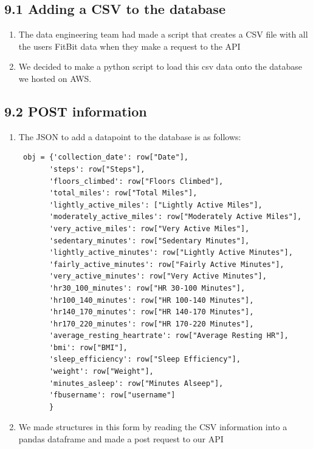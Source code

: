 \documentclass[]{book}
\providecommand{\tightlist}{%
  \setlength{\itemsep}{0pt}\setlength{\parskip}{0pt}}
\begin{document}
\subsection{9.1 Adding a CSV to the
database}\label{adding-a-csv-to-the-database-1}

\begin{enumerate}
\def\labelenumi{\arabic{enumi}.}
\tightlist
\item
  The data engineering team had made a script that creates a CSV file
  with all the users FitBit data when they make a request to the API
\item
  We decided to make a python script to load this csv data onto the
  database we hosted on AWS.
\end{enumerate}

\subsection{9.2 POST information}\label{post-information-1}

\begin{enumerate}
\def\labelenumi{\arabic{enumi}.}
\item
  The JSON to add a datapoint to the database is as follows:

\begin{verbatim}
 obj = {'collection_date': row["Date"],
       'steps': row["Steps"],
       'floors_climbed': row["Floors Climbed"],
       'total_miles': row["Total Miles"],
       'lightly_active_miles': ["Lightly Active Miles"],
       'moderately_active_miles': row["Moderately Active Miles"],
       'very_active_miles': row["Very Active Miles"],
       'sedentary_minutes': row["Sedentary Minutes"],
       'lightly_active_minutes': row["Lightly Active Minutes"],
       'fairly_active_minutes': row["Fairly Active Minutes"],
       'very_active_minutes': row["Very Active Minutes"],
       'hr30_100_minutes': row["HR 30-100 Minutes"],
       'hr100_140_minutes': row["HR 100-140 Minutes"],
       'hr140_170_minutes': row["HR 140-170 Minutes"],
       'hr170_220_minutes': row["HR 170-220 Minutes"],
       'average_resting_heartrate': row["Average Resting HR"],
       'bmi': row["BMI"],
       'sleep_efficiency': row["Sleep Efficiency"],
       'weight': row["Weight"],
       'minutes_asleep': row["Minutes Alseep"],
       'fbusername': row["username"]
       }
\end{verbatim}
\item
  We made structures in this form by reading the CSV information into a
  pandas dataframe and made a post request to our API
\end{enumerate}
\end{document}
